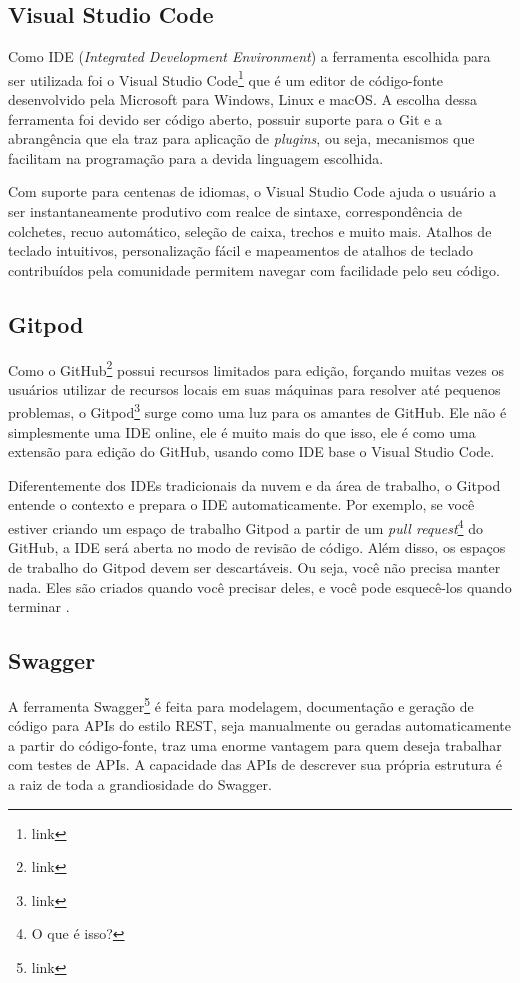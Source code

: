 \subsection{Visual Studio Code}
\label{ssec:VSCode}
Como IDE (\textit{Integrated Development Environment}) a ferramenta escolhida para ser utilizada foi o Visual Studio Code\footnote{link} que é um editor de código-fonte desenvolvido pela Microsoft para Windows, Linux e macOS. A escolha dessa ferramenta foi devido ser código aberto, possuir suporte para o Git e a abrangência que ela traz para aplicação de \textit{plugins}, ou seja, mecanismos que facilitam na programação para a devida linguagem escolhida.

Com suporte para centenas de idiomas, o Visual Studio Code ajuda o usuário a ser instantaneamente produtivo com realce de sintaxe, correspondência de colchetes, recuo automático, seleção de caixa, trechos e muito mais. Atalhos de teclado intuitivos, personalização fácil e mapeamentos de atalhos de teclado contribuídos pela comunidade permitem navegar com facilidade pelo seu código. \cite{mjbvz2020VSCode}


\subsection{Gitpod}
\label{ssec:Gitpod}
Como o GitHub\footnote{link} possui recursos limitados para edição, forçando muitas vezes os usuários utilizar de recursos locais em suas máquinas para resolver até pequenos problemas, o Gitpod\footnote{link} surge como uma luz para os amantes de GitHub. Ele não é simplesmente uma IDE online, ele é muito mais do que isso, ele é como uma extensão para edição do GitHub, usando como IDE base o Visual Studio Code. 

Diferentemente dos IDEs tradicionais da nuvem e da área de trabalho, o Gitpod entende o contexto e prepara o IDE automaticamente. Por exemplo, se você estiver criando um espaço de trabalho Gitpod a partir de um \textit{pull request}\footnote{O que é isso?} do GitHub, a IDE será aberta no modo de revisão de código. Além disso, os espaços de trabalho do Gitpod devem ser descartáveis. Ou seja, você não precisa manter nada. Eles são criados quando você precisar deles, e você pode esquecê-los quando terminar \cite{jankeromnes2020Gitpod}. 


\subsection{Swagger}
\label{ssec:Swagger}
A ferramenta Swagger\footnote{link} é feita para modelagem, documentação e geração de código para APIs do estilo REST, seja manualmente ou geradas automaticamente a partir do código-fonte, traz uma enorme vantagem para quem deseja trabalhar com testes de APIs. A capacidade das APIs de descrever sua própria estrutura é a raiz de toda a grandiosidade do Swagger.

